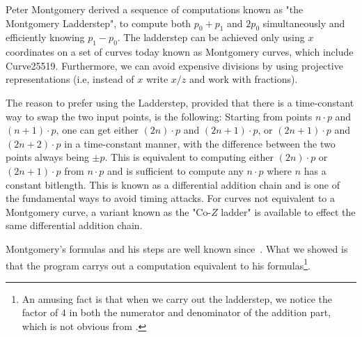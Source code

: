 Peter Montgomery derived a sequence of computations known
as "the Montgomery Ladderstep", to compute both $p_0+p_1$ and $2p_0$
simultaneously and efficiently knowing $p_1-p_0$.  The ladderstep can
be achieved only using $x$ coordinates on a set of curves today known as
Montgomery curves, which include Curve25519.  Furthermore, we can
avoid expensive divisions by using projective representations (i.e,
instead of $x$ write $x/z$ and work  with fractions).  

The reason to prefer using the Ladderstep, provided that there is a
time-constant way to swap the two input points, is the following: 
Starting from points $n \cdot p $ and
$ (n+1) \cdot p $, one can get either $ (2n) \cdot p $ and
$(2n+1) \cdot p$, or $(2n+1) \cdot p$ and $(2n+2) \cdot p$ in a
time-constant manner, with the difference between the two points
always being $\pm p$.  This is equivalent to computing either
$(2n) \cdot p$ or $(2n+1) \cdot p$ from $n \cdot p$ and is sufficient
to compute any $n \cdot p$ where $n$ has a constant bitlength.  This
is known as a differential addition chain and is one of the
fundamental ways to avoid timing attacks.  For curves not
equivalent to a Montgomery curve, a variant known as the "Co-$Z$
ladder" is available to effect the same differential addition chain.

Montgomery's formulas and his steps are well known
since~\cite{M:87:SPEC}.  What we showed is that the program carrys out
a computation equivalent to his formulas\footnote{An amusing fact is
  that when we carry out the ladderstep, we notice the factor of $4$
  in both the numerator and denominator of the addition part, which is
  not obvious from \cite[line 11, page 261]{M:87:SPEC}.}.

%
% 
%

